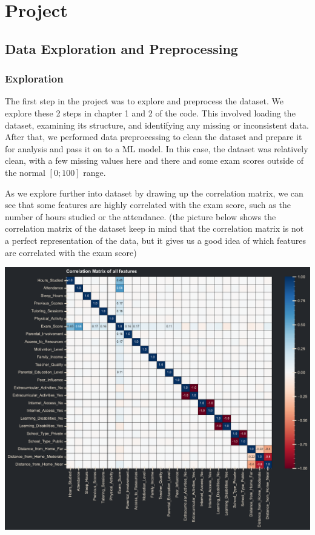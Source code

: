 \documentclass{assignment}
\begin{document}
\newpage
\section{Project}
\subsection{Data Exploration and Preprocessing}
\subsubsection{Exploration}
The first step in the project was to explore and preprocess the dataset. We explore these 2 steps in chapter 1 and 2 of the code.
This involved loading the dataset, examining its structure, and identifying any missing or inconsistent data.
After that, we performed data preprocessing to clean the dataset and prepare it for analysis and pass it on to a ML model.
In this case, the dataset was relatively clean, with a few missing values here and there and some exam scores outside of the normal $[0;100]$ range.



As we explore further into dataset by drawing up the correlation matrix, we can see that some features are highly correlated with the exam score, such as the number of hours studied
or the attendance. (the picture below shows the correlation matrix of the dataset keep in mind that the correlation matrix is not a perfect representation of the data, but it gives us a good idea of which features are correlated with the exam score)
\begin{center}
    \includegraphics[width=5.5in]{../report/assets/correlation_matrix.pdf}
\end{center}
\end{document}
